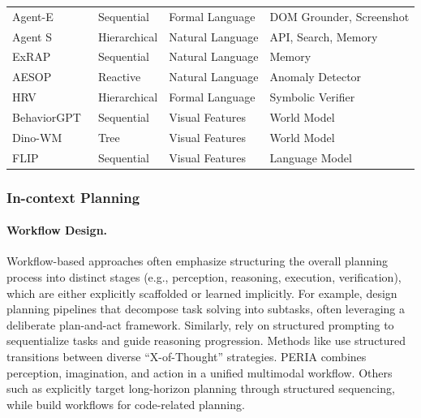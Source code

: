 \begin{table}[!t]
\begin{tabular}{p{3cm}>{\centering\arraybackslash}p{3cm}>{\centering\arraybackslash}p{4cm}>{\centering\arraybackslash}p{5.5cm}}
Agent-E~\cite{abuelsaad2024agent} & Sequential & Formal Language & DOM Grounder, Screenshot \\
Agent S~\cite{agashe2024agent} & Hierarchical & Natural Language & API, Search, Memory \\
ExRAP~\cite{yoo2024exploratory} & Sequential & Natural Language & Memory \\
AESOP~\cite{sinha2024real} & Reactive & Natural Language & Anomaly Detector \\
HRV~\cite{cornelio2025hierarchical} & Hierarchical & Formal Language & Symbolic Verifier \\
BehaviorGPT~\cite{zhou2024behaviorgpt} & Sequential & Visual Features & World Model \\
Dino-WM~\cite{zhou2024dino} & Tree & Visual Features & World Model \\
FLIP~\cite{gao2024flip} & Sequential & Visual Features & Language Model \\
\bottomrule
\end{tabular}
\label{tab:agentic_planning_methods}
\end{table}

\subsubsection{In-context Planning}
\paragraph{Workflow Design.} Workflow-based approaches often emphasize structuring the overall planning process into distinct stages (e.g., perception, reasoning, execution, verification), which are either explicitly scaffolded or learned implicitly. For example, \cite{liu2023llmp,valmeekam2023planning,xu2023rewoo,hao2024llm} design planning pipelines that decompose task solving into subtasks, often leveraging a deliberate plan-and-act framework. Similarly, \cite{zhou2022least,wang2023plan,sel2023algorithm,shen2023hugginggpt} rely on structured prompting to sequentialize tasks and guide reasoning progression. Methods like \cite{liu2023plan} use structured transitions between diverse ``X-of-Thought'' strategies. PERIA \cite{ni2024peria} combines perception, imagination, and action in a unified multimodal workflow. Others such as \cite{erdogan2025plan} explicitly target long-horizon planning through structured sequencing, while \cite{wen2024codeplan} build workflows for code-related planning. 


